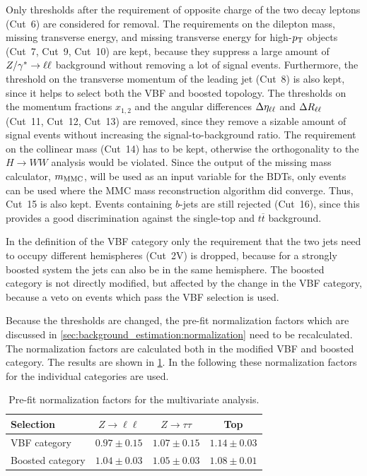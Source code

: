Only thresholds after the requirement of opposite charge of the two decay leptons (Cut~6) are considered for removal.
The requirements on the dilepton mass, missing transverse energy, and missing transverse energy for high-$p_\text{T}$ objects
(Cut~7, Cut~9, Cut~10) are kept, because they suppress a large amount of $Z / \gamma^* \to \ell \ell$ background without removing a lot of signal
events.
Furthermore, the threshold on the transverse momentum of the leading jet (Cut~8) is also kept, since it helps to select
both the VBF and boosted topology.
The thresholds on the momentum fractions $x_{1,2}$ and the angular differences
$\Delta \eta_{\ell\ell}$ and $\Delta R_{\ell\ell}$ (Cut~11, Cut~12, Cut~13) are removed, since they remove a sizable amount of signal events without
increasing the signal-to-background ratio.
The requirement on the collinear mass (Cut~14) has to be kept, otherwise the orthogonality to the $H \to WW$ analysis would be violated.
Since the output of the missing mass calculator, $m_\text{MMC}$, will be used as an input variable for the BDTs, only events can be used where
the MMC mass reconstruction algorithm did converge.
Thus, Cut~15 is also kept.
Events containing $b$-jets are still rejected (Cut~16), since this provides a good discrimination against the
single-top and $t\overline{t}$ background.

In the definition of the VBF category only the requirement that the two jets need to occupy different hemispheres (Cut~2V)
is dropped, because for a strongly boosted system the jets can also be in the same hemisphere.
The boosted category is not directly modified, but affected by the change in the VBF category, because a veto on events which pass the VBF selection is used.

Because the thresholds are changed, the pre-fit normalization factors which are discussed in \cref{sec:background_estimation:normalization}
need to be recalculated.
The normalization factors are calculated both in the modified VBF and boosted category.
The results are shown in \cref{tab:mva:event_selection:NF}.
In the following these normalization factors for the individual categories are used.

\begin{table}[htpb]
    \centering
    \caption{Pre-fit normalization factors for the multivariate analysis.}\label{tab:mva:event_selection:NF}
    \begin{tabular}{lccc}
        \toprule
        Selection        & $Z \to \ell\ell$ & $Z \to \tau\tau$ & Top \\ \midrule
        VBF category     & $0.97 \pm 0.15$ & $1.07 \pm 0.15$ & $1.14 \pm 0.03$ \\
        Boosted category & $1.04 \pm 0.03$ & $1.05 \pm 0.03$ & $1.08 \pm 0.01$ \\
        \bottomrule
    \end{tabular}
\end{table}

